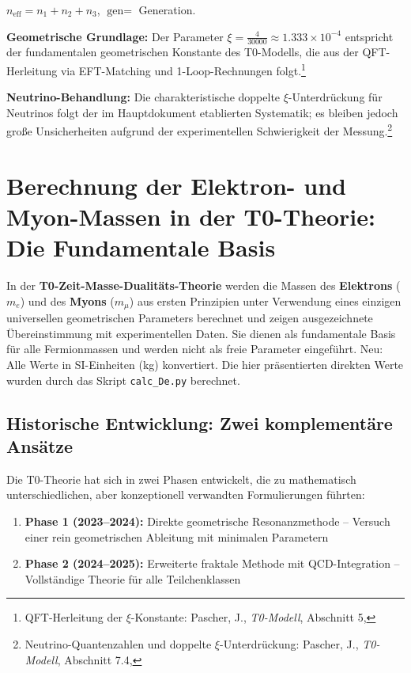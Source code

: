 	$n_{\text{eff}} = n_1 + n_2 + n_3$, $\text{gen} =$ Generation.
	
	\textbf{Geometrische Grundlage:} Der Parameter $\xi = \frac{4}{30000} \approx 1.333 \times 10^{-4}$ entspricht der fundamentalen geometrischen Konstante des T0-Modells, die aus der QFT-Herleitung via EFT-Matching und 1-Loop-Rechnungen folgt.\footnote{QFT-Herleitung der $\xi$-Konstante: Pascher, J., \emph{T0-Modell}, Abschnitt 5, }
	
	\textbf{Neutrino-Behandlung:} Die charakteristische doppelte $\xi$-Unterdrückung für Neutrinos folgt der im Hauptdokument etablierten Systematik; es bleiben jedoch große Unsicherheiten aufgrund der experimentellen Schwierigkeit der Messung.\footnote{Neutrino-Quantenzahlen und doppelte $\xi$-Unterdrückung: Pascher, J., \emph{T0-Modell}, Abschnitt 7.4, }
	
	\section{Berechnung der Elektron- und Myon-Massen in der T0-Theorie: Die Fundamentale Basis}
	
	In der \textbf{T0-Zeit-Masse-Dualitäts-Theorie} werden die Massen des \textbf{Elektrons} ($m_e$) und des \textbf{Myons} ($m_\mu$) aus ersten Prinzipien unter Verwendung eines einzigen universellen geometrischen Parameters berechnet und zeigen ausgezeichnete Übereinstimmung mit experimentellen Daten. Sie dienen als fundamentale Basis für alle Fermionmassen und werden nicht als freie Parameter eingeführt. Neu: Alle Werte in SI-Einheiten (kg) konvertiert. Die hier präsentierten direkten Werte wurden durch das Skript \texttt{calc\_De.py} berechnet.
	
	\subsection{Historische Entwicklung: Zwei komplementäre Ansätze}
	
	Die T0-Theorie hat sich in zwei Phasen entwickelt, die zu mathematisch unterschiedlichen, aber konzeptionell verwandten Formulierungen führten:
	
	\begin{enumerate}
		\item \textbf{Phase 1 (2023--2024):} Direkte geometrische Resonanzmethode -- Versuch einer rein geometrischen Ableitung mit minimalen Parametern
		\item \textbf{Phase 2 (2024--2025):} Erweiterte fraktale Methode mit QCD-Integration -- Vollständige Theorie für alle Teilchenklassen
	\end{enumerate}
	
